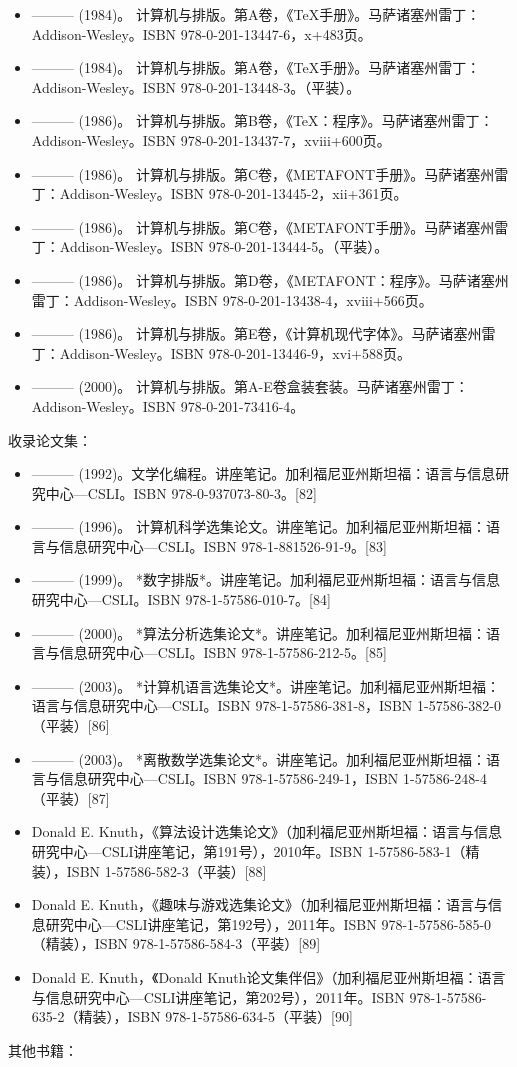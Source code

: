 \begin{itemize}
\item ——— (1984)。 计算机与排版。第A卷，《TeX手册》。马萨诸塞州雷丁：Addison-Wesley。ISBN 978-0-201-13447-6，x+483页。  
\item ——— (1984)。 计算机与排版。第A卷，《TeX手册》。马萨诸塞州雷丁：Addison-Wesley。ISBN 978-0-201-13448-3。（平装）。  
\item ——— (1986)。 计算机与排版。第B卷，《TeX：程序》。马萨诸塞州雷丁：Addison-Wesley。ISBN 978-0-201-13437-7，xviii+600页。  
\item ——— (1986)。 计算机与排版。第C卷，《METAFONT手册》。马萨诸塞州雷丁：Addison-Wesley。ISBN 978-0-201-13445-2，xii+361页。  
\item ——— (1986)。 计算机与排版。第C卷，《METAFONT手册》。马萨诸塞州雷丁：Addison-Wesley。ISBN 978-0-201-13444-5。（平装）。  
\item ——— (1986)。 计算机与排版。第D卷，《METAFONT：程序》。马萨诸塞州雷丁：Addison-Wesley。ISBN 978-0-201-13438-4，xviii+566页。  
\item ——— (1986)。 计算机与排版。第E卷，《计算机现代字体》。马萨诸塞州雷丁：Addison-Wesley。ISBN 978-0-201-13446-9，xvi+588页。  
\item ——— (2000)。 计算机与排版。第A-E卷盒装套装。马萨诸塞州雷丁：Addison-Wesley。ISBN 978-0-201-73416-4。  
\end{itemize}
收录论文集：
\begin{itemize}
\item ——— (1992)。文学化编程。讲座笔记。加利福尼亚州斯坦福：语言与信息研究中心—CSLI。ISBN 978-0-937073-80-3。[82]  
\item ——— (1996)。 计算机科学选集论文。讲座笔记。加利福尼亚州斯坦福：语言与信息研究中心—CSLI。ISBN 978-1-881526-91-9。[83]  
\item ——— (1999)。 *数字排版*。讲座笔记。加利福尼亚州斯坦福：语言与信息研究中心—CSLI。ISBN 978-1-57586-010-7。[84]  
\item ——— (2000)。 *算法分析选集论文*。讲座笔记。加利福尼亚州斯坦福：语言与信息研究中心—CSLI。ISBN 978-1-57586-212-5。[85]  
\item ——— (2003)。 *计算机语言选集论文*。讲座笔记。加利福尼亚州斯坦福：语言与信息研究中心—CSLI。ISBN 978-1-57586-381-8，ISBN 1-57586-382-0（平装）[86]  
\item ——— (2003)。 *离散数学选集论文*。讲座笔记。加利福尼亚州斯坦福：语言与信息研究中心—CSLI。ISBN 978-1-57586-249-1，ISBN 1-57586-248-4（平装）[87]  
\item Donald E. Knuth，《算法设计选集论文》（加利福尼亚州斯坦福：语言与信息研究中心—CSLI讲座笔记，第191号），2010年。ISBN 1-57586-583-1（精装），ISBN 1-57586-582-3（平装）[88]  
\item Donald E. Knuth，《趣味与游戏选集论文》（加利福尼亚州斯坦福：语言与信息研究中心—CSLI讲座笔记，第192号），2011年。ISBN 978-1-57586-585-0（精装），ISBN 978-1-57586-584-3（平装）[89]  
\item Donald E. Knuth，《Donald Knuth论文集伴侣》（加利福尼亚州斯坦福：语言与信息研究中心—CSLI讲座笔记，第202号），2011年。ISBN 978-1-57586-635-2（精装），ISBN 978-1-57586-634-5（平装）[90]
\end{itemize}
其他书籍：

